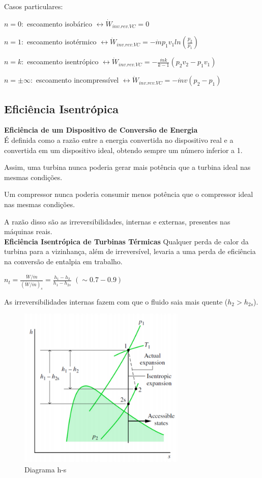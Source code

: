 \documentclass[a4paper, 12pt]{article}
\begin{document}
Casos particulares:
	\begin{center}
		$ n = 0: $ escoamento isobárico $ \leftrightarrow  \dot{W}_{inv.rev.VC} = 0 $ 
		
		$ n = 1: $ escoamento isotérmico $ \leftrightarrow  \dot{W}_{inv.rev.VC} = -\dot{m}p_1v_1ln(\frac{p_2}{p_1}) $ 
		
		$ n = k: $ escoamento isentrópico $ \leftrightarrow  \dot{W}_{inv.rev.VC} = -\frac{\dot{m}k}{k-1}(p_2v_2-p_1v_1) $ 
		
		$ n = \pm\infty: $ escoamento incompressível $ \leftrightarrow  \dot{W}_{inv.rev.VC} = -\dot{m}v(p_2-p_1) $ 
	\end{center}

\subsection{Eficiência Isentrópica}
\textbf{Eficiência de um Dispositivo de Conversão de Energia}\\
É definida como a razão entre a energia convertida no dispositivo real e a convertida em um dispositivo ideal, obtendo sempre um número inferior a 1.

Assim, uma turbina nunca poderia gerar mais potência que a turbina ideal nas
mesmas condições.

Um compressor nunca poderia consumir menos potência que o compressor ideal nas
mesmas condições.

A razão disso são as irreversibilidades, internas e externas, presentes nas máquinas
reais.\\

\textbf{Eficiência Isentrópica de Turbinas Térmicas}
Qualquer perda de calor da turbina para a vizinhança, além de
irreversível, levaria a uma perda de eficiência na conversão de
entalpia em trabalho.
	\begin{center}
		\large
		$ n_t = \frac{\dot{W}/\dot{m}}{(\dot{W}/\dot{m})_s} = \frac{h_1 - h_2}{h_1 - h_{2s}}$ $ (\sim0.7 - 0.9) $
	\end{center}
As irreversibilidades internas fazem com que o fluido saia mais
quente ($ h_2 > h_{2s} $).
	\begin{figure}[h]
		\includegraphics[width = 8cm]{hs.png}
		\centering
		\caption{Diagrama h-s}
	\end{figure}
\end{document}
